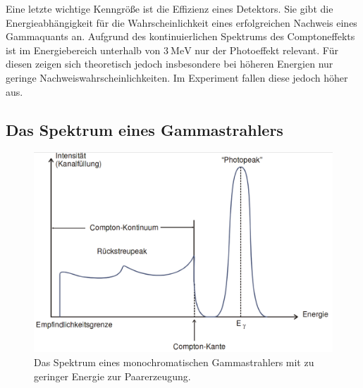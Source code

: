Eine letzte wichtige Kenngröße ist die Effizienz eines Detektors. Sie gibt die Energieabhängigkeit für die Wahrscheinlichkeit eines erfolgreichen Nachweis eines Gammaquants an. Aufgrund des kontinuierlichen Spektrums des Comptoneffekts ist im Energiebereich unterhalb von $\SI{3}{\mega\electronvolt}$ nur der Photoeffekt relevant. Für diesen zeigen sich theoretisch jedoch insbesondere bei höheren Energien nur geringe Nachweiswahrscheinlichkeiten. Im Experiment fallen diese jedoch höher aus. 

\subsection{Das Spektrum eines Gammastrahlers}

\begin{figure}
	\centering
	\includegraphics[width=\linewidth-100pt,height=\textheight-100pt,keepaspectratio]{content/Images/spek.png}
    \caption{Das Spektrum eines monochromatischen Gammastrahlers mit zu geringer Energie zur Paarerzeugung\cite{V18}.}
    \label{fig:spektrum}
\end{figure}

